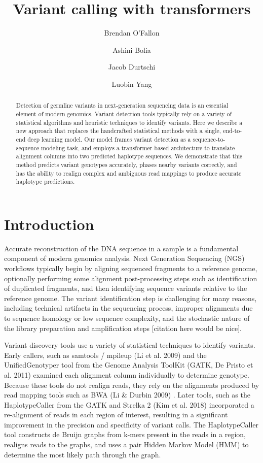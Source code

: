 \documentclass[]{article}
\title{Variant calling with transformers}
\author[1]{Brendan O'Fallon}
\author[1]{Ashini Bolia}
\author[1]{Jacob Durtschi}
\author[1]{Luobin Yang}
\affil[1]{ARUP Institute for Clinical and Experimental Pathology, Salt Lake City, UT}
\date{}
\begin{document}
\maketitle

\begin{abstract}
	Detection of germline variants in next-generation sequencing data is an essential element of modern genomics. Variant detection tools typically rely on a variety of statistical algorithms and heuristic techniques to identify variants. Here we describe a new approach that replaces the handcrafted statistical methods with a single, end-to-end deep learning model. Our model frames variant detection as a sequence-to-sequence modeling task, and employs a transformer-based architecture to translate alignment columns into two predicted haplotype sequences. We demonstrate that this method predicts variant genotypes accurately, phases nearby variants correctly, and has the ability to realign complex and ambiguous read mappings to produce accurate haplotype predictions. 
\end{abstract}

\section{Introduction}

Accurate reconstruction of the DNA sequence in a sample is a fundamental component of modern genomics analysis. Next Generation Sequencing (NGS) workflows typically begin by aligning sequenced fragments to a reference genome, optionally performing some alignment post-processing steps such as identification of duplicated fragments, and then identifying sequence variants relative to the reference genome. The variant identification step is challenging for many reasons, including technical artifacts in the sequencing process, improper alignments due to sequence homology or low sequence complexity, and the stochastic nature of the library preparation and amplification steps [citation here would be nice]. 


Variant discovery tools use a variety of statistical techniques to identify variants. Early callers, such as samtools / mpileup (Li et al. 2009) and the UnifiedGenotyper tool from the Genome Analysis ToolKit (GATK, De Pristo et al. 2011) examined each alignment column individually to determine genotype. Because these tools do not realign reads, they rely on the alignments produced by read mapping tools such as BWA (Li \& Durbin 2009) . Later tools, such as the HaplotypeCaller from the GATK and Strelka 2 (Kim et al. 2018) incorporated a re-alignment of reads in each region of interest, resulting in a significant improvement in the precision and specificity of variant calls. The HaplotypeCaller tool constructs de Bruijn graphs from k-mers present in the reads in a region, realigns reads to the graphs, and uses a pair Hidden Markov Model (HMM) to determine the most likely path through the graph. 
\end{document}
